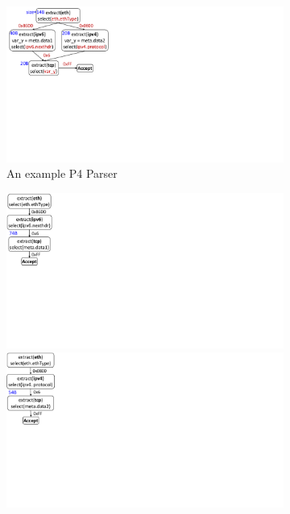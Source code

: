 \begin{figure}[!h]
    \begin{subfigure}[b]{0.3\linewidth}
        \centering
        \includegraphics[trim=4 270 596 0, clip,scale=0.4]{parser-transformation-example}
        \caption{An example P4 Parser}
        \label{subfig:parser}
    \end{subfigure}
    \begin{subfigure}[b]{0.3\linewidth}
        \centering
        \includegraphics[trim=4 285 796 0, clip,scale=0.4]{parser-example-se-1}
        \includegraphics[trim=4 285 796 0, clip,scale=0.4]{parser-example-se-2}

\end{subfigure}
\end{figure}
